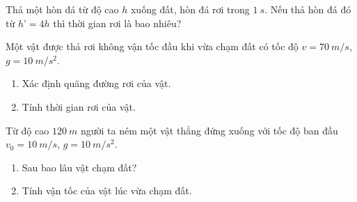 \begin{ex}
	Thả một hòn đá từ độ cao $h$ xuống đất, hòn đá rơi trong $\SI{1}{s}$. Nếu thả hòn đá đó từ $h’ = 4h$ thì thời gian rơi là bao nhiêu?
\end{ex}

\begin{ex}
	Một vật được thả rơi không vận tốc đầu khi vừa chạm đất có tốc độ $v=\SI{70}{m/s}$, $g = \SI{10}{m/s^2}$.
	\begin{enumerate}[label=\alph*)]
		\item Xác định quãng đường rơi của vật.
		\item Tính thời gian rơi của vật.
	\end{enumerate}
\end{ex}

\begin{ex}
	Từ độ cao $\SI{120}{m}$ người ta ném một vật thẳng đứng xuống với tốc độ ban đầu $v_0 = \SI{10}{m/s}$, $g = \SI{10}{m/s^2}$.
	\begin{enumerate}[label=\alph*)]
		\item Sau bao lâu vật chạm đất?
		\item Tính vận tốc của vật lúc vừa chạm đất.
	\end{enumerate}
\end{ex}

